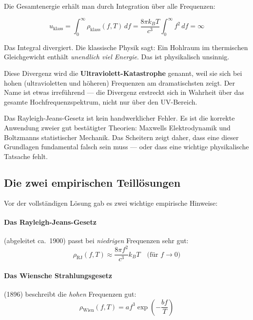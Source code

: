 Die Gesamtenergie erhält man durch Integration über alle Frequenzen:

\begin{equation}
    u_{\text{klass}} = \int_0^\infty \rho_{\text{klass}}(f, T) \, df 
    = \frac{8\pi k_B T}{c^3} \int_0^\infty f^2 \, df = \infty
    \label{eq:uv_divergence}
\end{equation}

Das Integral divergiert. Die klassische Physik sagt: Ein Hohlraum im thermischen 
Gleichgewicht enthält \emph{unendlich viel Energie}. Das ist physikalisch unsinnig.

Diese Divergenz wird die \textbf{Ultraviolett-Katastrophe} genannt, weil sie sich 
bei hohen (ultravioletten und höheren) Frequenzen am dramatischsten zeigt. Der Name 
ist etwas irreführend — die Divergenz erstreckt sich in Wahrheit über das gesamte 
Hochfrequenzspektrum, nicht nur über den UV-Bereich.

\begin{important}
    Das Rayleigh-Jeans-Gesetz ist kein handwerklicher Fehler. Es ist die korrekte 
    Anwendung zweier gut bestätigter Theorien: Maxwells Elektrodynamik und Boltzmanns 
    statistischer Mechanik. Das Scheitern zeigt daher, dass eine dieser Grundlagen 
    fundamental falsch sein muss — oder dass eine wichtige physikalische Tatsache 
    fehlt.
\end{important}

\subsection{Die zwei empirischen Teillösungen}

Vor der vollständigen Lösung gab es zwei wichtige empirische Hinweise:

\paragraph{Das Rayleigh-Jeans-Gesetz} (abgeleitet ca.~1900) passt bei \emph{niedrigen} 
Frequenzen sehr gut:
\begin{equation}
    \rho_{\text{RJ}}(f, T) \approx \frac{8\pi f^2}{c^3} k_B T \quad \text{(für } f \to 0\text{)}
\end{equation}

\paragraph{Das Wiensche Strahlungsgesetz} (1896) beschreibt die \emph{hohen} Frequenzen 
gut:
\begin{equation}
    \rho_{\text{Wien}}(f, T) = af^3 \exp\!\left(-\frac{bf}{T}\right)
    \label{eq:wien_law}
\end{equation}

